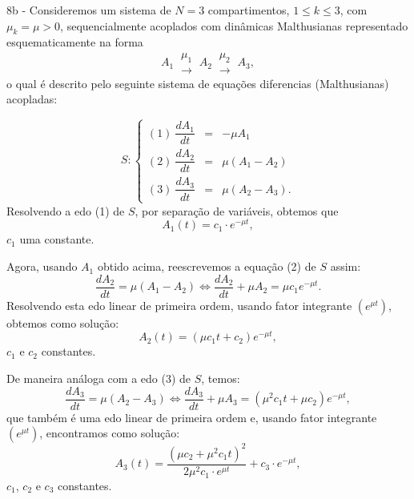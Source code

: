 		8b - Consideremos um sistema de \(N = 3\) compartimentos, \(1 \le k \le 3\), com \(\mu_k = \mu > 0\), sequencialmente acoplados com dinâmicas Malthusianas representado esquematicamente na forma
		\[
		A_1 \ \substack{\mu_1 \\ \longrightarrow} \
		A_2 \ \substack{\mu_2 \\ \longrightarrow} \
		A_3,
		\]
		o qual é descrito pelo seguinte sistema de equações diferencias (Malthusianas) acopladas:

		\[S: 
		\left\{ \begin{array}{rcl}
	
		(1)\ \dfrac{dA_{1}}{dt} &=& -\mu A_{1} \\[0.3cm]
		(2)\ \dfrac{dA_{2}}{dt} &=& \mu(A_1 - A_{2}) \\[0.3cm]
		(3)\ \dfrac{dA_{3}}{dt} &=& \mu(A_2 - A_{3}).
		\end{array}\right.
		\]		
		Resolvendo a edo (1) de $S$, por separação de variáveis, obtemos que $$A_1(t) = c_1 \cdot e^{-\mu t},$$
		$c_1$ uma constante.
		
		Agora, usando $A_1$ obtido acima, reescrevemos a equação (2) de $S$ assim:
		\[
		\dfrac{dA_{2}}{dt} = \mu(A_1 - A_{2}) \Leftrightarrow \dfrac{dA_{2}}{dt} + \mu A_2 = \mu c_1 e^{-\mu t}.
		\]
		Resolvendo esta edo linear de primeira ordem, usando fator integrante $(e^{\mu t})$, obtemos como solução: 
		$$
		A_2(t) = (\mu c_1 t + c_2)e^{-\mu t},
		$$
		$c_1$ e $c_2$ constantes.
		
		De maneira análoga com a edo (3) de $S$, temos:
		\[
		\dfrac{dA_{3}}{dt} = \mu(A_2 - A_{3}) \Leftrightarrow \dfrac{dA_{3}}{dt} + \mu A_3 = (\mu^2 c_1 t + \mu c_2)e^{-\mu t},
		\]
		que também é uma edo linear de primeira ordem e, usando fator integrante $(e^{\mu t})$, encontramos como solução:
		\[
		A_3(t) = \dfrac{(\mu c_2 + \mu^2 c_1 t)^2}{2\mu^2 c_1 \cdot e^{\mu t}} + c_3 \cdot e^{-\mu t},
		\] 
		$c_1$, $c_2$ e $c_3$ constantes.
		
		



